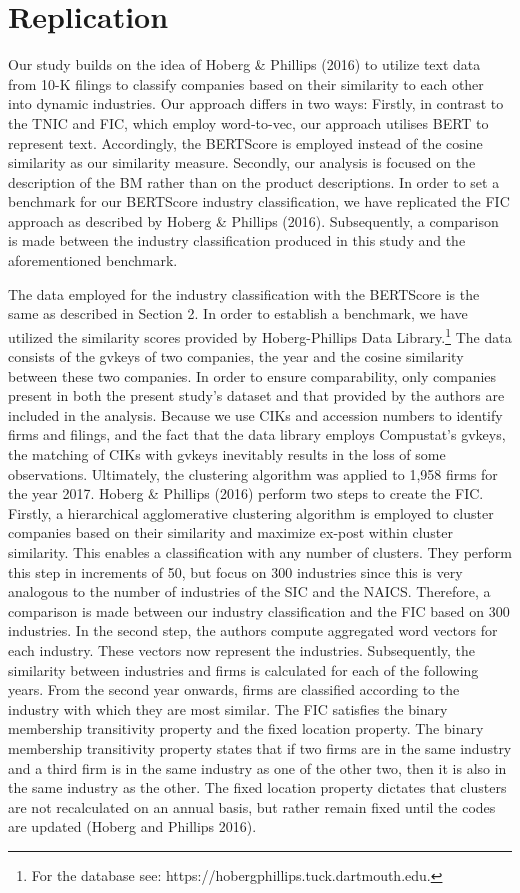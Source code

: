 \documentclass[
]{article}
\begin{document}
\section{Replication}\label{replication}

Our study builds on the idea of Hoberg \& Phillips (2016) to utilize
text data from 10-K filings to classify companies based on their
similarity to each other into dynamic industries. Our approach differs
in two ways: Firstly, in contrast to the TNIC and FIC, which employ
word-to-vec, our approach utilises BERT to represent text. Accordingly,
the BERTScore is employed instead of the cosine similarity as our
similarity measure. Secondly, our analysis is focused on the description
of the BM rather than on the product descriptions. In order to set a
benchmark for our BERTScore industry classification, we have replicated
the FIC approach as described by Hoberg \& Phillips (2016).
Subsequently, a comparison is made between the industry classification
produced in this study and the aforementioned benchmark.

The data employed for the industry classification with the BERTScore is
the same as described in Section 2. In order to establish a benchmark,
we have utilized the similarity scores provided by Hoberg-Phillips Data
Library.\footnote{For the database see:
  https://hobergphillips.tuck.dartmouth.edu.} The data consists of the
gvkeys of two companies, the year and the cosine similarity between
these two companies. In order to ensure comparability, only companies
present in both the present study's dataset and that provided by the
authors are included in the analysis. Because we use CIKs and accession
numbers to identify firms and filings, and the fact that the data
library employs Compustat's gvkeys, the matching of CIKs with gvkeys
inevitably results in the loss of some observations. Ultimately, the
clustering algorithm was applied to 1,958 firms for the year 2017.
Hoberg \& Phillips (2016) perform two steps to create the FIC. Firstly,
a hierarchical agglomerative clustering algorithm is employed to cluster
companies based on their similarity and maximize ex-post within cluster
similarity. This enables a classification with any number of clusters.
They perform this step in increments of 50, but focus on 300 industries
since this is very analogous to the number of industries of the SIC and
the NAICS. Therefore, a comparison is made between our industry
classification and the FIC based on 300 industries. In the second step,
the authors compute aggregated word vectors for each industry. These
vectors now represent the industries. Subsequently, the similarity
between industries and firms is calculated for each of the following
years. From the second year onwards, firms are classified according to
the industry with which they are most similar. The FIC satisfies the
binary membership transitivity property and the fixed location property.
The binary membership transitivity property states that if two firms are
in the same industry and a third firm is in the same industry as one of
the other two, then it is also in the same industry as the other. The
fixed location property dictates that clusters are not recalculated on
an annual basis, but rather remain fixed until the codes are updated
(Hoberg and Phillips 2016).
\end{document}

